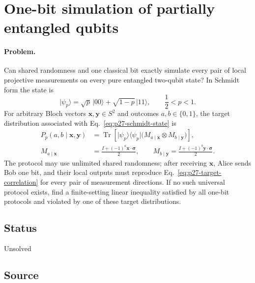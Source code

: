 \section{One-bit simulation of partially entangled qubits}
\label{sec:problem-27}

\paragraph{Problem.}
Can shared randomness and one classical bit exactly simulate every pair of
local projective measurements on every pure entangled two-qubit state?  In
Schmidt form the state is
\begin{equation}
  \lvert\psi_p\rangle
  =\sqrt p\,\lvert00\rangle+\sqrt{1-p}\,\lvert11\rangle,
  \qquad \frac12<p<1.
  \label{eq:p27-schmidt-state}
\end{equation}
For arbitrary Bloch vectors $\mathbf x,\mathbf y\in S^2$ and outcomes
$a,b\in\{0,1\}$, the target distribution associated with
Eq.~\eqref{eq:p27-schmidt-state} is
\begin{equation}
  \begin{aligned}
  P_p(a,b\mid\mathbf x,\mathbf y)
    &=\operatorname{Tr}\!\left[
      \lvert\psi_p\rangle\!\langle\psi_p\rvert
      \bigl(M_{a\mid\mathbf x}\otimes M_{b\mid\mathbf y}\bigr)
      \right],\\
  M_{a\mid\mathbf x}
    &=\frac{I+(-1)^a\mathbf x\cdot\boldsymbol\sigma}{2},
  \qquad
  M_{b\mid\mathbf y}
    =\frac{I+(-1)^b\mathbf y\cdot\boldsymbol\sigma}{2}.
  \end{aligned}
  \label{eq:p27-target-correlation}
\end{equation}
The protocol may use unlimited shared randomness; after receiving
$\mathbf x$, Alice sends Bob one bit, and their local outputs must reproduce
Eq.~\eqref{eq:p27-target-correlation} for every pair of measurement
directions.  If no such universal protocol exists, find a finite-setting
linear inequality satisfied by all one-bit protocols and violated by one of
these target distributions.

\subsection*{Status}

Unsolved

\subsection*{Source}

